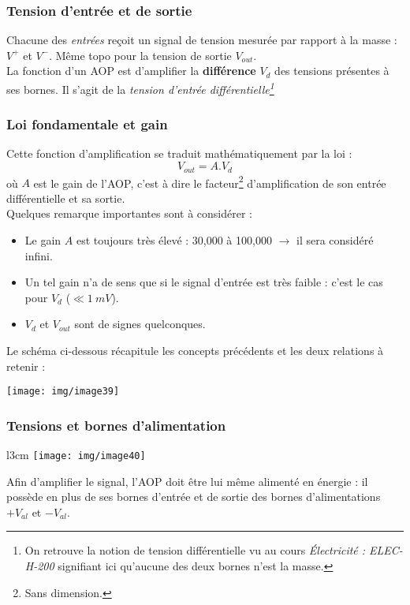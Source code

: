 \subsubsection{Tension d'entrée et de sortie}
Chacune des \textit{entrées} reçoit un signal de tension mesurée par rapport à la masse : $V^+$ et $V^-$. Même topo pour la tension de sortie $V_{out}$.\\
La fonction d'un AOP est d'amplifier la \textbf{différence} $V_d$ des tensions présentes à ses bornes. Il s'agit de la \textit{tension d'entrée différentielle\footnote{On retrouve la notion de tension différentielle vu au cours \textit{Électricité : ELEC-H-200} signifiant ici qu'aucune des deux bornes n'est la masse.}}

\subsubsection{Loi fondamentale et gain}
Cette fonction d'amplification se traduit mathématiquement par la loi : 
\begin{equation}
	V_{out} = A.V_d
\end{equation}
où $A$ est le gain de l'AOP, c'est à dire le facteur\footnote{Sans dimension.} d'amplification de son entrée différentielle et sa sortie.\\
Quelques remarque importantes sont à considérer :
\begin{itemize}
	\item Le gain $A$ est toujours très élevé : 30,000 à 100,000 $\rightarrow$ il sera considéré infini.
	\item Un tel gain n'a de sens que si le signal d'entrée est très faible : c'est le cas pour $V_d$ ($\ll 1\ mV$).
	\item $V_d$ et $V_{out}$ sont de signes quelconques.
\end{itemize}
Le schéma ci-dessous récapitule les concepts précédents et les deux relations à retenir :
\begin{center}
	\texttt{[image: img/image39]}
\end{center}


\subsubsection{Tensions et bornes d'alimentation}
\begin{wrapfigure}[8]{l}{3cm}
	\texttt{[image: img/image40]}
\end{wrapfigure}
Afin d'amplifier le signal, l'AOP doit être lui même alimenté en énergie : il possède en plus de ses bornes d'entrée et de sortie des bornes d'alimentations $+V_{al}$ et $-V_{al}$. \\

